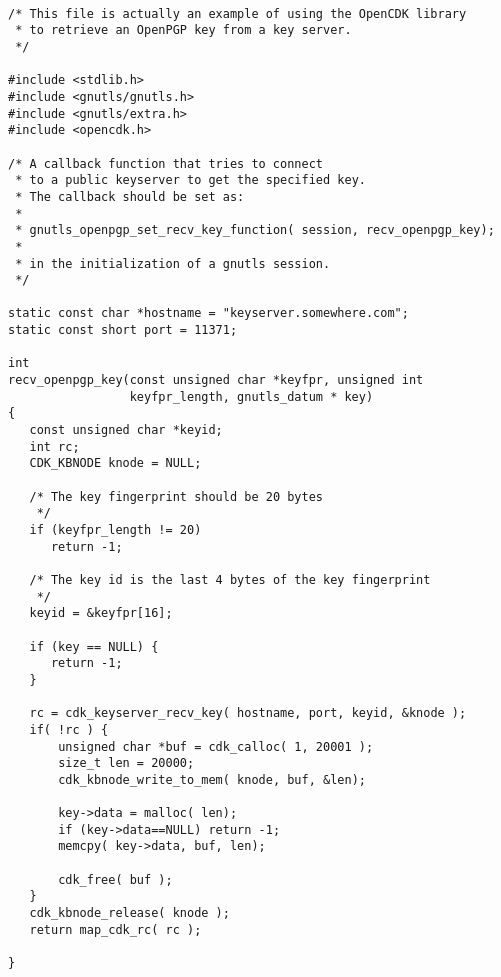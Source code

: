 \begin {verbatim}

/* This file is actually an example of using the OpenCDK library
 * to retrieve an OpenPGP key from a key server.
 */

#include <stdlib.h>
#include <gnutls/gnutls.h>
#include <gnutls/extra.h>
#include <opencdk.h>

/* A callback function that tries to connect
 * to a public keyserver to get the specified key.
 * The callback should be set as:
 *
 * gnutls_openpgp_set_recv_key_function( session, recv_openpgp_key);
 *
 * in the initialization of a gnutls session.
 */

static const char *hostname = "keyserver.somewhere.com";
static const short port = 11371;

int
recv_openpgp_key(const unsigned char *keyfpr, unsigned int
                 keyfpr_length, gnutls_datum * key)
{
   const unsigned char *keyid;
   int rc;
   CDK_KBNODE knode = NULL;

   /* The key fingerprint should be 20 bytes
    */
   if (keyfpr_length != 20)
      return -1;

   /* The key id is the last 4 bytes of the key fingerprint
    */
   keyid = &keyfpr[16];

   if (key == NULL) {
      return -1;
   }

   rc = cdk_keyserver_recv_key( hostname, port, keyid, &knode );
   if( !rc ) {
       unsigned char *buf = cdk_calloc( 1, 20001 );
       size_t len = 20000;
       cdk_kbnode_write_to_mem( knode, buf, &len);

       key->data = malloc( len);
       if (key->data==NULL) return -1;
       memcpy( key->data, buf, len);

       cdk_free( buf );
   }
   cdk_kbnode_release( knode );
   return map_cdk_rc( rc );

}


\end{verbatim}
